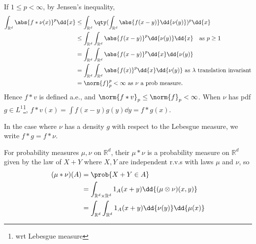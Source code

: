 \begin{remark}
	If $1 \leq p < \infty$, by Jensen's inequality,
	\begin{align*}
		\int_{\mathbb{R}^d} \abs{f \ast \nu(x)}^p \dd{x} &\leq \int_{\mathbb R^d} \qty( \int_{\mathbb R^d} \abs{f(x-y)} \dd{\nu(y)} )^p \dd{x} \\
		&\leq \int_{\mathbb R^d} \int_{\mathbb R^d} \abs{f(x-y)}^p \dd{\nu(y)} \dd{x} \quad \text{as $p \geq 1$}\\
		&= \int_{\mathbb R^d} \int_{\mathbb R^d} \abs{f(x-y)}^p \dd{x} \dd{\nu(y)} \\
		&= \int_{\mathbb R^d} \int_{\mathbb R^d} \abs{f(x)}^p \dd{x} \dd{\nu(y)} \text{ as $\lambda$ translation invariant} \\
		&= \norm{f}_p^p < \infty \text{ as $\nu$ a prob measure.}
	\end{align*}
	Hence $f \ast v$ is defined a.e., and $\norm{f \ast v}_p \leq \norm{f}_p < \infty$.
	When $\nu$ has pdf $g \in L^1$\footnote{wrt Lebesgue measure}, $f \ast v(x) = \int f(x-y) g(y) \dd{y} = f \ast g(x)$.




\end{remark}

In the case where $\nu$ has a density $g$ with respect to the Lebesgue measure, we write $f \ast g = f \ast \nu$.

\begin{definition}[Convolution]
	For probability measures $\mu, \nu$ on $\mathbb R^d$, their  $\mu \ast \nu$ is a probability measure on $\mathbb R^d$ given by the law of $X + Y$ where $X, Y$ are independent r.v.s with laws $\mu$ and $\nu$, so
	\begin{align*}
		(\mu \ast \nu)(A) &= \prob{X+Y \in A} \\
		&= \int_{\mathbb R^d \times \mathbb R^d} 1_A(x+y) \dd{(\mu \otimes \nu)(x, y)} \\
		&= \int_{\mathbb R^d} \int_{\mathbb R^d} 1_A(x+y) \dd{\nu(y)} \dd{\mu(x)}
	\end{align*}
\end{definition}

